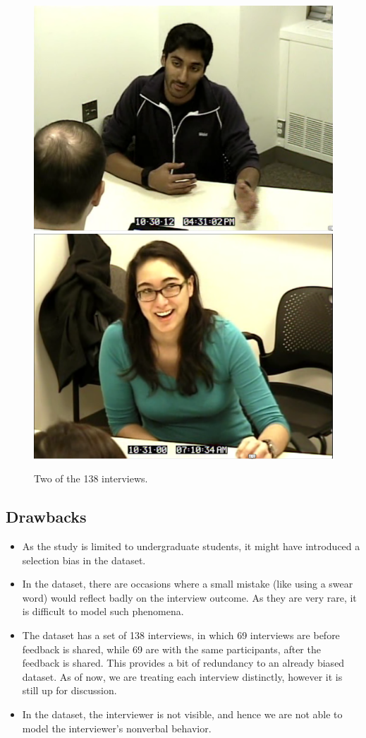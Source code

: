 \documentclass[11pt]{article}
\begin{document}
\begin{figure}[h!]
\begin{center}
\includegraphics[width=0.5\columnwidth]{figures/Screenshot from 2016-10-21 20-30-05/Screenshot from 2016-10-21 20-30-05}
\includegraphics[width=0.5\columnwidth]{figures/Screenshot from 2016-11-28 06-21-02.png}
\caption{Two of the 138 interviews.}
\label{fig:dataset}
\end{center}
\end{figure}

\subsection{Drawbacks}
\begin{itemize}
 \item As the study is limited to undergraduate students, it might have introduced a selection bias in the dataset. 
 \item In the dataset, there are occasions where a small mistake (like using a swear word) would reflect badly on the interview outcome. As they are very rare, it is difficult to model such phenomena.
 \item The dataset has a set of 138 interviews, in which 69 interviews are before feedback is shared, while 69 are with the same participants, after the feedback is shared. This provides a bit of redundancy to an already biased dataset. As of now, we are treating each interview distinctly, however it is still up for discussion.
 \item In the dataset, the interviewer is not visible, and hence we are not able to model the interviewer’s nonverbal behavior.
\end{itemize}
\end{document}
